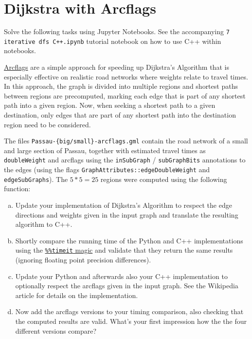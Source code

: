 \documentclass{article}
\begin{document}
\section{Dijkstra with Arcflags}
Solve the following tasks using Jupyter Notebooks. See the accompanying \texttt{7 iterative dfs C++.ipynb} tutorial notebook on how to use C++ within notebooks.

\href{https://de.wikipedia.org/wiki/Arcflag}{Arcflags} are a simple approach for speeding up Dijkstra's Algorithm that is especially effective on realistic road networks where weights relate to travel times.
In this approach, the graph is divided into multiple regions and shortest paths between regions are precomputed, marking each edge that is part of any shortest path into a given region.
Now, when seeking a shortest path to a given destination, only edges that are part of any shortest path into the destination region need to be considered.

The files \texttt{Passau-\{big/small\}-arcflags.gml} contain the road network of a small and large section of Passau, together with estimated travel times as \texttt{doubleWeight} and arcflags using the \texttt{inSubGraph} / \texttt{subGraphBits} annotations to the edges (using the flags \texttt{GraphAttributes::edgeDoubleWeight} and \texttt{edgeSubGraphs}). The $5*5=25$ regions were computed using the following function:
\vspace{-.3cm}
\begin{quote}

\end{quote}
\vspace{-.5cm}

\begin{enumerate}[a)]
\item Update your implementation of Dijkstra's Algorithm to respect the edge directions and weights given in the input graph and translate the resulting algorithm to C++.
\item Shortly compare the running time of the Python and C++ implementations using the \href{https://ipython.readthedocs.io/en/stable/interactive/magics.html\#magic-timeit}{\texttt{\%\%timeit} magic} and validate that they return the same results (ignoring floating point precision differences).
\item Update your Python and afterwards also your C++ implementation to optionally respect the arcflags given in the input graph. See the Wikipedia article for details on the implementation.
\item Now add the arcflags versions to your timing comparison, also checking that the computed results are valid. What's your first impression how the the four different versions compare?
\end{enumerate}
\end{document}
